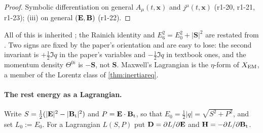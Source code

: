 \begin{proof}
Symbolic differentiation on general $A_\mu(t,\mathbf x)$ and $j^\mu(t,\mathbf x)$ (r1-20, r1-21, r1-23); (iii) on general $(\mathbf E,\mathbf B)$ (r1-22).
\end{proof}

All of this is inherited \cite{Jackson,LandauLifshitz2,Rainich1925}; the Rainich identity and $E_6^2=E_0^2+|\mathbf S|^2$ are restated from
. Two signs are fixed by the paper's orientation and are easy to lose: the second invariant is
$+\tfrac12\Im q$ in the paper's variables and $-\tfrac12\Im q$ in textbook ones, and the momentum density $\Theta^{0i}$ is $-\mathbf S$, not
$\mathbf S$. Maxwell's Lagrangian is the $\eta$-form of $X_{\rm EM}$, a member of the Lorentz class of \cref{thm:inertiareq}.

\paragraph{The rest energy as a Lagrangian.}
Write $S=\tfrac12(|\mathbf E|^2-|\mathbf B_{\rm t}|^2)$ and $P=\mathbf E\cdot\mathbf B_{\rm t}$, so that $E_0=\tfrac12|q|=\sqrt{S^2+P^2}$, and set $L_0:=E_0$.
For a Lagrangian $L(S,P)$ put $\mathbf D=\partial L/\partial\mathbf E$ and $\mathbf H=-\partial L/\partial\mathbf B_{\rm t}$.


